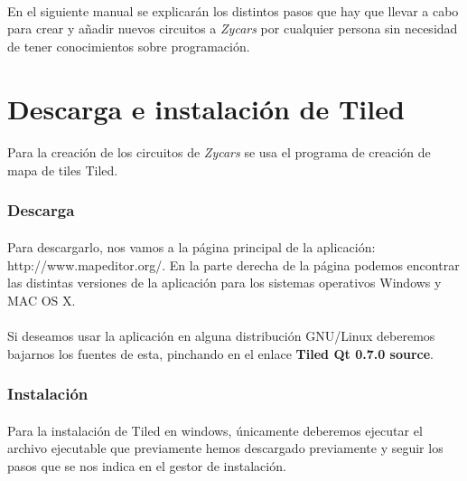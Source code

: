 \paragraph{}
En el siguiente manual se explicarán los distintos pasos que hay que llevar a cabo para crear y añadir nuevos circuitos a
\emph{Zycars} por cualquier persona sin necesidad de tener conocimientos sobre programación.

\section{Descarga e instalación de Tiled}

\paragraph{}
Para la creación de los circuitos de \emph{Zycars} se usa el programa de creación de mapa de tiles Tiled. 

\subsubsection{Descarga}

\paragraph{}
Para descargarlo, nos vamos a la página principal de la aplicación: http://www.mapeditor.org/. En la parte derecha de la 
página podemos encontrar las distintas versiones de la aplicación para los sistemas operativos Windows y MAC OS X.

\paragraph{}
Si deseamos usar la aplicación en alguna distribución GNU/Linux deberemos
bajarnos los fuentes de esta, pinchando en el enlace
\textbf{Tiled Qt 0.7.0 source}.

\subsubsection{Instalación}

\paragraph{}
Para la instalación de Tiled en windows, únicamente deberemos ejecutar el
archivo ejecutable que previamente hemos descargado
previamente y seguir los pasos que se nos indica en el gestor de instalación.

